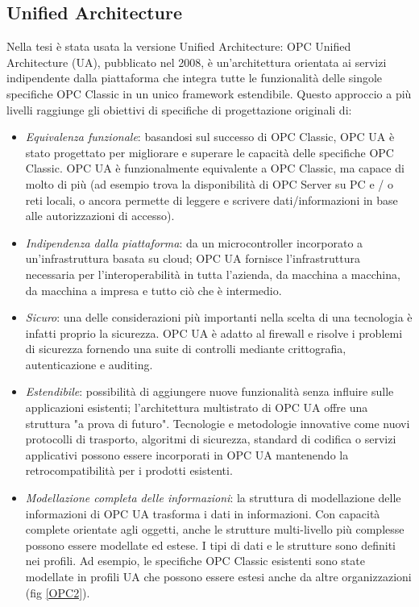 \documentclass[12pt, a4paper, oneside]{book}
\begin{document}
\subsection{Unified Architecture}
Nella tesi è stata usata la versione Unified Architecture: OPC Unified Architecture (UA), pubblicato nel 2008, è un'architettura orientata ai servizi indipendente dalla piattaforma che integra tutte le funzionalità delle singole specifiche OPC Classic in un unico framework estendibile. Questo approccio a più livelli raggiunge gli obiettivi di specifiche di progettazione originali di:
\begin{itemize}
	\item \textit{Equivalenza funzionale}: basandosi sul successo di OPC Classic, OPC UA è stato progettato per migliorare e superare le capacità delle specifiche OPC Classic. OPC UA è funzionalmente equivalente a OPC Classic, ma capace di molto di più (ad esempio trova la disponibilità di OPC Server su PC e / o reti locali, o ancora permette di leggere e scrivere dati/informazioni in base alle autorizzazioni di accesso).
	\item \textit{Indipendenza dalla piattaforma}: da un microcontroller incorporato a un'infrastruttura basata su cloud; OPC UA fornisce l'infrastruttura necessaria per l'interoperabilità in tutta l'azienda, da macchina a macchina, da macchina a impresa e tutto ciò che è intermedio.
	\item \textit{Sicuro}: una delle considerazioni più importanti nella scelta di una tecnologia è infatti proprio la sicurezza. OPC UA è adatto al firewall e risolve i problemi di sicurezza fornendo una suite di controlli mediante crittografia, autenticazione e auditing.
	\item \textit{Estendibile}: possibilità di aggiungere nuove funzionalità senza influire sulle applicazioni esistenti; l'architettura multistrato di OPC UA offre una struttura "a prova di futuro". Tecnologie e metodologie innovative come nuovi protocolli di trasporto, algoritmi di sicurezza, standard di codifica o servizi applicativi possono essere incorporati in OPC UA mantenendo la retrocompatibilità per i prodotti esistenti.
	\item \textit{Modellazione completa delle informazioni}: la struttura di modellazione delle informazioni di OPC UA trasforma i dati in informazioni. Con capacità complete orientate agli oggetti, anche le strutture multi-livello più complesse possono essere modellate ed estese. I tipi di dati e le strutture sono definiti nei profili. Ad esempio, le specifiche OPC Classic esistenti sono state modellate in profili UA che possono essere estesi anche da altre organizzazioni (fig \ref{OPC2}).

\end{itemize}
\end{document}
